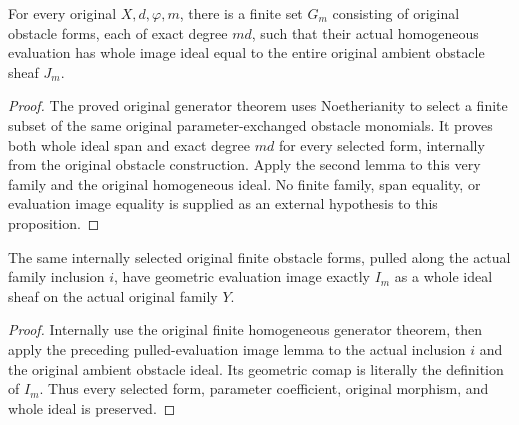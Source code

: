 \begin{proposition}
\label{prop:c0n-original-obstacle-evaluation-image}
\leanok
For every original $X,d,\varphi,m$, there is a finite set $G_m$ consisting
of original obstacle forms, each of exact degree $md$, such that their
actual homogeneous evaluation has whole image ideal equal to the entire
original ambient obstacle sheaf $J_m$.
\end{proposition}
\begin{proof}
The proved original generator theorem uses Noetherianity to select a
finite subset of the same original parameter-exchanged obstacle monomials.
It proves both whole ideal span and exact degree $md$ for every selected
form, internally from the original obstacle construction.  Apply the
second lemma to this very family and the original homogeneous ideal.
No finite family, span equality, or evaluation image equality is supplied
as an external hypothesis to this proposition.
\end{proof}

\begin{proposition}
\label{prop:c0n-original-family-evaluation-image}
\leanok
The same internally selected original finite obstacle forms, pulled along
the actual family inclusion $i$, have geometric evaluation image exactly
$I_m$ as a whole ideal sheaf on the actual original family $Y$.
\end{proposition}
\begin{proof}
Internally use the original finite homogeneous generator theorem, then
apply the preceding pulled-evaluation image lemma to the actual inclusion
$i$ and the original ambient obstacle ideal.  Its geometric comap is
literally the definition of $I_m$.  Thus every selected form, parameter
coefficient, original morphism, and whole ideal is preserved.
\end{proof}

